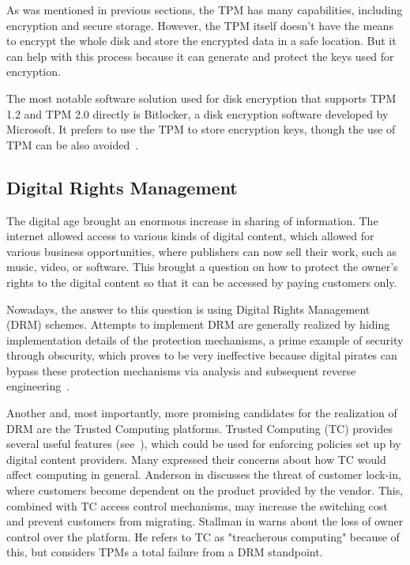 As was mentioned in previous sections, the TPM has many capabilities, including encryption and secure storage. However, the TPM itself doesn't have the means to encrypt the whole disk and store the encrypted data in a safe location. But it can help with this process because it can generate and protect the keys used for encryption.

The most notable software solution used for disk encryption that supports TPM 1.2 and TPM 2.0 directly is Bitlocker, a disk encryption software developed by Microsoft. It prefers to use the TPM to store encryption keys, though the use of TPM can be also avoided~\cite{bitlockerMDocs}.

\subsection{Digital Rights Management}
The digital age brought an enormous increase in sharing of information. The internet allowed access to various kinds of digital content, which allowed for various business opportunities, where publishers can now sell their work, such as music, video, or software. This brought a question on how to protect the owner's rights to the digital content so that it can be accessed by paying customers only.

Nowadays, the answer to this question is using Digital Rights Management (DRM) schemes. Attempts to implement DRM are generally realized by hiding implementation details of the protection mechanisms, a prime example of security through obscurity, which proves to be very ineffective because digital pirates can bypass these protection mechanisms via analysis and subsequent reverse engineering~\cite{liu2003digital}.

Another and, most importantly, more promising candidates for the realization of DRM are the Trusted Computing platforms. Trusted Computing (TC) provides several useful features (see~), which could be used for enforcing policies set up by digital content providers. Many expressed their concerns about how TC would affect computing in general. Anderson in \cite{anderson2003cryptography} discusses the threat of customer lock-in, where customers become dependent on the product provided by the vendor. This, combined with TC access control mechanisms, may increase the switching cost and prevent customers from migrating. Stallman in \cite{stallman2002treacherous} warns about the loss of owner control over the platform. He refers to TC as "treacherous computing" because of this, but considers TPMs a total failure from a DRM standpoint. 

